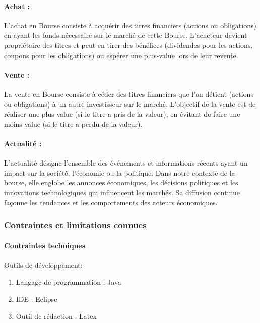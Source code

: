 \paragraph{Achat : }L'achat en Bourse consiste à acquérir des titres financiers (actions
ou obligations) en ayant les fonds nécessaire sur le marché
de cette Bourse. L'acheteur devient propriétaire des titres et peut en tirer des bénéfices
(dividendes pour les actions, coupons pour les obligations) ou espérer une plus-value
lors de leur revente.

\paragraph{Vente :} La vente en Bourse consiste à céder des titres financiers que l'on détient
(actions ou obligations) à un autre investisseur sur le marché. L'objectif de la vente est de
réaliser une plus-value (si le titre a pris de la valeur), en évitant de faire  une moins-value (si le titre a
perdu de la valeur).

\paragraph{Actualité : }L'actualité désigne l'ensemble des événements et informations récents ayant
un impact sur la société, l'économie ou la politique. Dans notre contexte de la bourse, elle
englobe les annonces économiques, les décisions politiques et les innovations
technologiques qui influencent les marchés. Sa diffusion continue façonne les
tendances et les comportements des acteurs économiques.









\subsubsection{Contraintes et limitations connues}

\paragraph{Contraintes techniques} 
\paragraph{} Outils de développement:
\begin{enumerate}
\item Langage de programmation : Java
\item IDE : Eclipse
\item Outil de rédaction : Latex
\end{enumerate}

